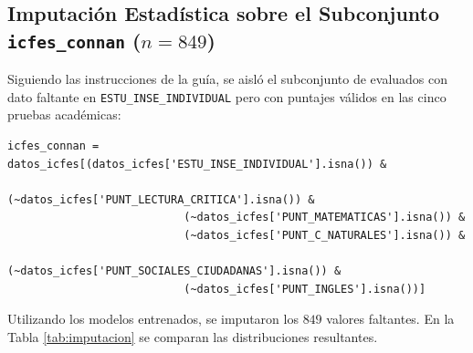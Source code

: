 \documentclass[11pt,letterpaper]{article}
\begin{document}
\subsection{Imputación Estadística sobre el Subconjunto \texttt{icfes\_connan} ($n = 849$)}
Siguiendo las instrucciones de la guía, se aisló el subconjunto de evaluados con dato faltante en \texttt{ESTU\_INSE\_INDIVIDUAL} pero con puntajes válidos en las cinco pruebas académicas:
\begin{verbatim}
icfes_connan = datos_icfes[(datos_icfes['ESTU_INSE_INDIVIDUAL'].isna()) &
                           (~datos_icfes['PUNT_LECTURA_CRITICA'].isna()) &
                           (~datos_icfes['PUNT_MATEMATICAS'].isna()) &
                           (~datos_icfes['PUNT_C_NATURALES'].isna()) &
                           (~datos_icfes['PUNT_SOCIALES_CIUDADANAS'].isna()) &
                           (~datos_icfes['PUNT_INGLES'].isna())]
\end{verbatim}
Utilizando los modelos entrenados, se imputaron los $849$ valores faltantes. En la Tabla \ref{tab:imputacion} se comparan las distribuciones resultantes.

\begin{table}[H]
\centering
\caption{Comparación estadística entre el INSE observado (\texttt{icfes\_sin\_nan}) y el INSE imputado en \texttt{icfes\_connan} ($n=849$).}
\label{tab:imputacion}
\small
{}
\end{table}
\end{document}
